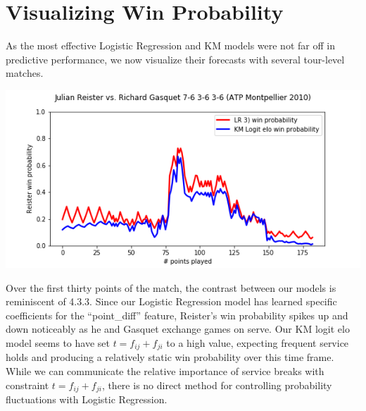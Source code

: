 \documentclass[chapterprefix=false]{report}
\begin{document}


\section{Visualizing Win Probability}

As the most effective Logistic Regression and KM models were not far off in predictive performance, we now visualize their forecasts with several tour-level matches. 

\includegraphics[scale=.7]{reister_gasquet}

Over the first thirty points of the match, the contrast between our models is reminiscent of 4.3.3. Since our Logistic Regression model has learned specific coefficients for the ``point\_diff'' feature, Reister's win probability spikes up and down noticeably as he and Gasquet exchange games on serve. Our KM logit elo model seems to have set $t = f_{ij} + f_{ji}$ to a high value, expecting frequent service holds and producing a relatively static win probability over this time frame. While we can communicate the relative importance of service breaks with constraint $t=f_{ij}+f_{ji}$, there is no direct method for controlling probability fluctuations with Logistic Regression.
\end{document}
